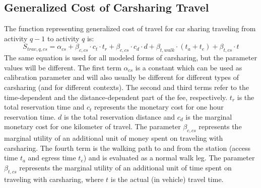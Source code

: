 \subsection{Generalized Cost of Carsharing Travel}
The function representing generalized cost of travel for car sharing traveling from activity $q-1$ to activity $q$ is:
%
\begin{equation}
S_{trav, q, cs} = \alpha_{cs} + \beta_{c,cs} \cdot c_{t} \cdot t_r + \beta_{c,cs} \cdot c_d \cdot d + \beta_{t, walk} \cdot (t_a + t_e) + \beta_{t,cs} \cdot  t
\end{equation}
%
The same equation is used for all modeled forms of carsharing, but the parameter values will be different. 
%
The first term $\alpha_{cs}$ is a constant which can be used as calibration parameter and will also usually be different for different types of carsharing (and for different contexts).
%
The second and third terms refer to the time-dependent and the distance-dependent part of the fee, respectively. 
%
$t_r$ is the total reservation time and $c_t$ represents the monetary cost for one hour reservation time.
%
$d$ is the total reservation distance and $c_d$ is the marginal monetary cost for one kilometer of travel. 
%
The parameter $\beta_{c,cs}$ represents the marginal utility of an additional unit of money spent on traveling with carsharing. 
%
The fourth term is the walking path to and from the station (access time $t_a$ and egress time $t_e$) and is evaluated as a normal walk leg. 
%
The parameter $\beta_{t,cs}$ represents the marginal utility of an additional unit of time spent on traveling with carsharing, where $t$ is the actual (in vehicle) travel time. 

